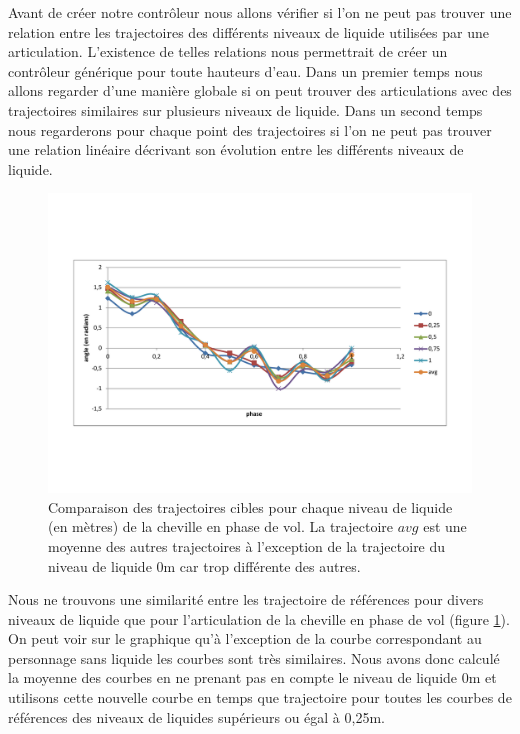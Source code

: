 \documentclass[runningheads,a4paper]{llncs}
\begin{document}
Avant de créer notre contrôleur nous allons vérifier si l'on ne peut pas trouver une relation entre les trajectoires des différents niveaux de liquide utilisées par une articulation. L'existence de telles relations nous permettrait de créer un contrôleur générique pour toute hauteurs d'eau. Dans un premier temps nous allons regarder d'une manière globale si on peut trouver des articulations avec des trajectoires similaires sur plusieurs niveaux de liquide. Dans un second temps nous regarderons pour chaque point des trajectoires si l'on ne peut pas trouver une relation linéaire décrivant son évolution entre les différents niveaux de liquide.

\vspace*{-0.25cm}
\begin{figure}[h]
\centering
\includegraphics[scale=0.4]{trajs_swing_ankle.pdf}
\caption{Comparaison des trajectoires cibles pour chaque niveau de liquide (en mètres) de la cheville en phase de vol. La trajectoire $avg$ est une moyenne des autres trajectoires à l'exception de la trajectoire du niveau de liquide 0m car trop différente des autres.}
\label{fig:comp_traj_swing_foot}
\end{figure}

Nous ne trouvons une similarité entre les trajectoire de références pour divers niveaux de liquide que pour l'articulation de la cheville en phase de vol (figure \ref{fig:comp_traj_swing_foot}). On peut voir sur le graphique qu'à l'exception de la courbe correspondant au personnage sans liquide les courbes sont très similaires. Nous avons donc calculé la moyenne des courbes en ne prenant pas en compte le niveau de liquide 0m et utilisons cette nouvelle courbe en temps que trajectoire pour toutes les courbes de références des niveaux de liquides supérieurs ou égal à 0,25m. 
\end{document}
